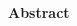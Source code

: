 %
%
%

\thispagestyle{empty}

\begin{adjustwidth}{-2cm}{}






\begin{Huge}\textbf{
\newline
\newline
\newline
\newline
\newline %
Abstract}\end{Huge} \\ \\

\blindtext

\blindtext






\end{adjustwidth}

